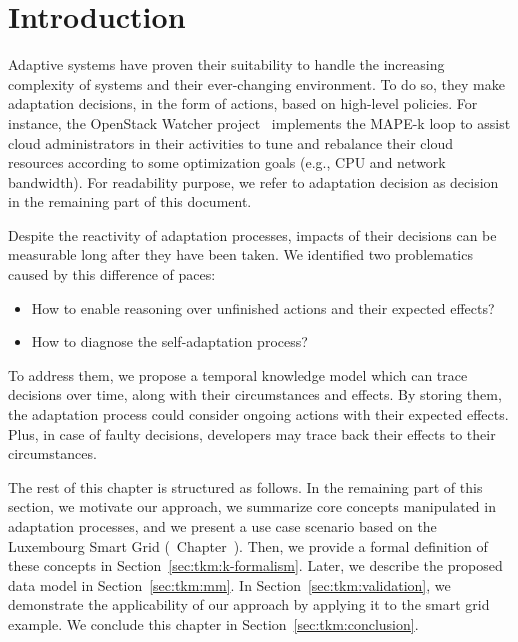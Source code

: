 \section{Introduction}


Adaptive systems have proven their suitability to handle the increasing complexity of systems and their ever-changing environment.
To do so, they make adaptation decisions, in the form of actions, based on high-level policies. 
For instance, the OpenStack Watcher project~\cite{OpenStack:Watcher:Wiki} implements the MAPE-k loop to assist cloud administrators in their activities to tune and rebalance their cloud resources according to some optimization goals (e.g., CPU and network bandwidth). 
For readability purpose, we refer to adaptation decision as decision in the remaining part of this document.

Despite the reactivity of adaptation processes, impacts of their decisions can be measurable long after they have been taken.
We identified two problematics caused by this difference of paces:
\begin{itemize}
	\item How to enable reasoning over unfinished actions and their expected effects?
	\item How to diagnose the self-adaptation process?
\end{itemize}

To address them, we propose a temporal knowledge model which can trace decisions over time, along with their circumstances and effects.
By storing them, the adaptation process could consider ongoing actions with their expected effects.
Plus, in case of faulty decisions, developers may trace back their effects to their circumstances.

The rest of this chapter is structured as follows.
In the remaining part of this section, we motivate our approach, we summarize core concepts manipulated in adaptation processes, and we present a use case scenario based on the Luxembourg Smart Grid (\cf~Chapter~).
Then, we provide a formal definition of these concepts in Section~\ref{sec:tkm:k-formalism}.
Later, we describe the proposed data model in Section~\ref{sec:tkm:mm}.
In Section~\ref{sec:tkm:validation}, we demonstrate the applicability of our approach by applying it to the smart grid example.
We conclude this chapter in Section~\ref{sec:tkm:conclusion}.

